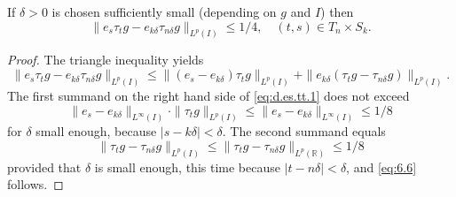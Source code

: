 \documentclass[10pt,a4paper]{amsart}
\newcommand\R{\mathbb{R}}
\newcommand{\SSS}{S}
\newcommand{\TTT}{T}
\newcommand{\ts}{\tau}
\renewcommand\le{\leqslant}
\begin{document}
\begin{lem}
\label{lem:d.es.tt}
If $\delta > 0$ is chosen sufficiently small (depending on $g$ and $I$) then 
\begin{equation}
\label{eq:6.6}
\|e_s \ts_t g - e_{k\delta} \ts_{n\delta} g\|_{L^p(I)} \le 1/4,
\quad (t,s) \in \TTT_n \times \SSS_k.
\end{equation}
\end{lem}

\begin{proof}
The triangle inequality yields
\begin{equation}
\label{eq:d.es.tt.1}
\|e_s \ts_t g - e_{k\delta} \ts_{n\delta} g\|_{L^p(I)}
\le \|(e_s-e_{k\delta}) \ts_t g\|_{L^p(I)} 
+ \|e_{k\delta} (\ts_t g - \ts_{n\delta}g)\|_{L^p(I)}.
\end{equation}
The first summand on the right hand side of \eqref{eq:d.es.tt.1} does not exceed 
\begin{equation}
\|e_s-e_{k\delta}\|_{L^\infty(I)}\cdot \|\ts_t g\|_{L^p(I)}
\le 	\|e_s-e_{k\delta}\|_{L^\infty(I)} \le 1/8
\end{equation}
for $\delta $  small enough, 
because $|s-k\delta| < \delta$. The second summand equals 
\begin{equation}
\|\ts_t g - \ts_{n\delta}g\|_{L^p(I)}
\le \|\ts_t g - \ts_{n\delta}g\|_{L^p(\R)}  \le 1/8
\end{equation}
provided that
 $\delta $  is small enough, this time
because $|t-n\delta| < \delta$, and \eqref{eq:6.6} follows.
\end{proof}
\end{document}
